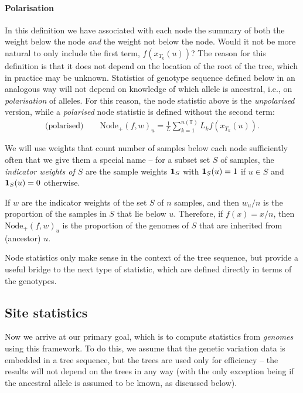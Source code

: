 \documentclass{article}
\newcommand{\nodep}{\mbox{Node}_+} %
\newcommand{\treeseq}{\mathbb{T}} %
\newcommand{\iw}{w} %
\newcommand{\nw}{x} %
\begin{document}
\paragraph{Polarisation}
In this definition we have associated with each node the summary of both the weight below the node
\emph{and} the weight not below the node.
Would it not be more natural to only include the first term, $f(\nw_{T_k}(u))$?
The reason for this definition is that it does not depend on the location of the root of the tree,
which in practice may be unknown.
Statistics of genotype sequence defined below in an analogous way
will not depend on knowledge of which allele is ancestral, i.e., on \emph{polarisation} of alleles.
For this reason, the node statistic above is the \emph{unpolarised} version,
while a \emph{polarised} node statistic is defined without the second term:
\begin{align}
    \text{(polarised)} \qquad
    \nodep(f, \iw)_u
    =
    \frac{1}{L} \sum_{k=1}^{n(\treeseq)} L_k f(\nw_{T_k}(u)) .
\end{align}

We will use weights that count number of samples below each node
sufficiently often that we give them a special name --
for a subset set $S$ of samples,
the \emph{indicator weights of $S$} are the sample weights $\mathbf{1}_S$ with
$\mathbf{1}_S(u) = 1$ if $u \in S$ and $\mathbf{1}_S(u) = 0$ otherwise.

\begin{example} \label{ex:ancestry_props}
    If $\iw$ are the indicator weights of the set $S$ of $n$ samples,
    and then $\iw_u / n$ is the proportion of the samples in $S$ that lie below $u$.
    Therefore, if $f(x) = x / n$,
    then $\nodep(f, \iw)_u$ is the proportion of the genomes of $S$
    that are inherited from (ancestor) $u$.
\end{example}

Node statistics only make sense in the context of the tree sequence,
but provide a useful bridge to the next type of statistic,
which are defined directly in terms of the genotypes.


\subsection*{Site statistics}

Now we arrive at our primary goal, which is to compute statistics from \emph{genomes}
using this framework.
To do this, we assume that the genetic variation data is embedded in a tree sequence,
but the trees are used only for efficiency --
the results will not depend on the trees in any way
(with the only exception being if the ancestral allele is assumed to be known, as discussed below).
\end{document}
